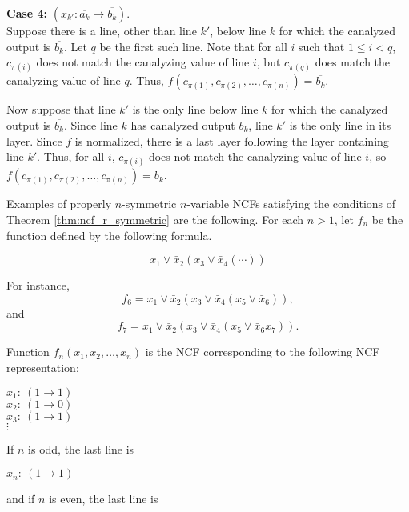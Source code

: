 \noindent
{\bf Case 4:} $(x_{k'} : \overline{a_k} \rightarrow \overline{b_k})$. \\

Suppose there is a line, other than line $k'$, below line $k$ for
which the canalyzed output is $\overline{b_k}$.  Let $q$ be the
first such line.  Note that for all $i$ such that $1 \leq i < q$,
$c_{\pi(i)}$ does not match the canalyzing value of line $i$, but
$c_{\pi(q)}$ does match the canalyzing value of line $q$.  Thus,
$f(c_{\pi(1)}, c_{\pi(2)}, \ldots, c_{\pi(n)}) = \overline{b_k}$.

Now suppose that line $k'$ is the only line below line $k$ for which
the canalyzed output is $\overline{b_k}$.  Since line $k$ has
canalyzed output $b_k$, line $k'$ is the only line in its layer.
Since $f$ is normalized, there is a last layer following the layer
containing line $k'$.  Thus, for all $i$, $c_{\pi(i)}$ does not
match the canalyzing value of line $i$, so $f(c_{\pi(1)}, c_{\pi(2)},
\ldots, c_{\pi(n)}) = \overline{b_k}$.  \QED


Examples of properly $n$-symmetric $n$-variable NCFs satisfying the
conditions of Theorem \ref{thm:ncf_r_symmetric} are the following.
For each $n > 1$, let $f_n$ be the function defined by the following
formula.

$$x_1 \vee \bar{x}_2 ( x_3 \vee \bar{x}_4 (\cdots  ) )$$

For instance,
$$f_6 = x_1 \vee \bar{x}_2 ( x_3 \vee \bar{x}_4 ( x_5 \vee \bar{x}_6  ) ),$$
and
$$f_7 = x_1 \vee \bar{x}_2 ( x_3 \vee \bar{x}_4 ( x_5 \vee \bar{x}_6   x_7) ).$$

Function $f_n(x_1, x_2, \ldots, x_n)$ is the NCF corresponding to
the following NCF representation:

\medskip
\noindent
\hspace*{0.5in}
$x_1:~ (1 \rightarrow 1)$ \\
\hspace*{0.5in}
$x_2:~ (1 \rightarrow 0)$ \\
\hspace*{0.5in}
$x_3:~ (1 \rightarrow 1)$ \\
\hspace*{0.75in}
$\vdots$ 

\noindent
If $n$ is odd, the last line is 

\noindent
\hspace*{0.5in}
$x_n:~ (1 \rightarrow 1)$ 

\noindent
and if $n$ is even, the last line is 


